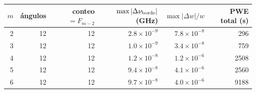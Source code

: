 \begin{tabular}{rrrrrr}
\toprule
$m$ & ángulos & conteo $=F_{m-2}$ & $\max|\Delta\nu_{\rm borde}|$ (GHz) & $\max|\Delta w|/w$ & PWE total (s) \\
\midrule
2 & 12 & 12 & $2.8\times10^{-9}$ & $7.8\times10^{-8}$ & 296 \\
3 & 12 & 12 & $1.0\times10^{-9}$ & $3.4\times10^{-8}$ & 759 \\
4 & 12 & 12 & $1.2\times10^{-8}$ & $1.2\times10^{-6}$ & 2508 \\
5 & 12 & 12 & $9.4\times10^{-8}$ & $4.1\times10^{-6}$ & 2560 \\
6 & 12 & 12 & $9.7\times10^{-8}$ & $4.0\times10^{-6}$ & 9188 \\
\bottomrule
\end{tabular}
